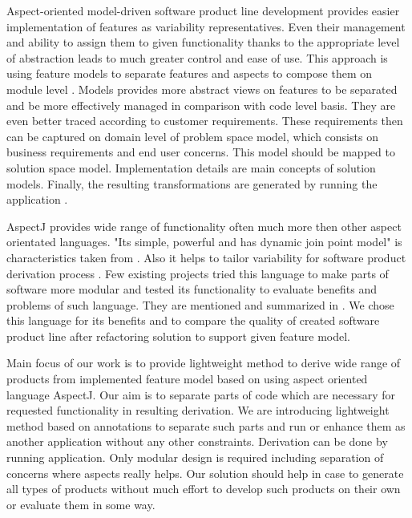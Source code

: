 \documentclass[11pt,english,a4paper,twoside]{article}
\begin{document}
Aspect-oriented model-driven software product line development provides easier implementation of features as variability representatives. Even their management and ability to assign them to given functionality thanks to the appropriate level of abstraction leads to much greater control and ease of use. This approach is using feature models to separate features and aspects to compose them on module level \cite{voelter_product_2007}. Models provides more abstract views on features to be separated and be more effectively managed in comparison with code level basis. They are even better traced according to customer requirements. These requirements then can be captured on domain level of problem space model, which consists on business requirements and end user concerns. This model should be mapped to solution space model. Implementation details are main concepts of solution models. Finally, the resulting transformations are generated by running the application \cite{voelter_product_2007}. 

AspectJ provides wide range of functionality often much more then other aspect orientated languages. "Its simple, powerful and has dynamic join point model" is characteristics taken from \cite{goos_overview_2001}. Also it helps to tailor variability for software product derivation process \cite{young_using_1999}. Few existing projects tried this language to make parts of software more modular and tested its functionality to evaluate benefits and problems of such language. They are mentioned and summarized in \cite{figueiredo_evolving_2008}. We chose this language for its benefits and to compare the quality of created software product line after refactoring solution to support given feature model.


Main focus of our work is to provide lightweight method to derive wide range of products from implemented feature model based on using aspect oriented language AspectJ. Our aim is to separate parts of code which are necessary for requested functionality in resulting derivation. We are introducing lightweight method based on annotations to separate such parts and run or enhance them as another application without any other constraints. Derivation can be done by running application. Only modular design is required including separation of concerns where aspects really helps. Our solution should help in case to generate all types of products without much effort to develop such products on their own or evaluate them in some way. 
 
\end{document}
